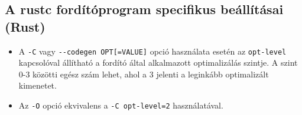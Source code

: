 \subsection{A rustc fordítóprogram specifikus beállításai (Rust)}
\begin{itemize}
  \item A \lstinline{-C} vagy \lstinline{--codegen OPT[=VALUE]} opció használata esetén az \lstinline{opt-level} kapcsolóval állítható a fordító által alkalmazott optimalizálás szintje. A szint 0-3 közötti egész szám lehet, ahol a 3 jelenti a leginkább optimalizált kimenetet.
  \item Az \lstinline{-O} opció ekvivalens a \lstinline{-C opt-level=2} használatával.
\end{itemize}
